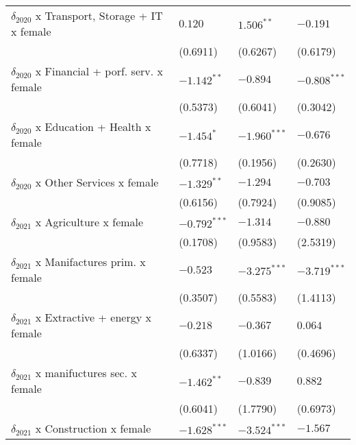 \begin{tabular}{llll}
$\delta_{2020}$ x Transport, Storage + IT x female &            $0.120$ &       $1.506^{**}$ &           $-0.191$ \\
                                                   &           (0.6911) &           (0.6267) &           (0.6179) \\
$\delta_{2020}$ x Financial + porf. serv. x female &      $-1.142^{**}$ &           $-0.894$ &     $-0.808^{***}$ \\
                                                   &           (0.5373) &           (0.6041) &           (0.3042) \\
$\delta_{2020}$ x Education + Health x female      &         $-1.454^*$ &     $-1.960^{***}$ &           $-0.676$ \\
                                                   &           (0.7718) &           (0.1956) &           (0.2630) \\
$\delta_{2020}$ x Other Services x female          &      $-1.329^{**}$ &           $-1.294$ &           $-0.703$ \\
                                                   &           (0.6156) &           (0.7924) &           (0.9085) \\
$\delta_{2021}$ x Agriculture x female             &     $-0.792^{***}$ &           $-1.314$ &           $-0.880$ \\
                                                   &           (0.1708) &           (0.9583) &           (2.5319) \\
$\delta_{2021}$ x Manifactures prim. x female      &           $-0.523$ &     $-3.275^{***}$ &     $-3.719^{***}$ \\
                                                   &           (0.3507) &           (0.5583) &           (1.4113) \\
$\delta_{2021}$ x Extractive + energy x female     &           $-0.218$ &           $-0.367$ &            $0.064$ \\
                                                   &           (0.6337) &           (1.0166) &           (0.4696) \\
$\delta_{2021}$ x manifuctures sec. x female       &      $-1.462^{**}$ &           $-0.839$ &            $0.882$ \\
                                                   &           (0.6041) &           (1.7790) &           (0.6973) \\
$\delta_{2021}$ x Construction x female            &     $-1.628^{***}$ &     $-3.524^{***}$ &           $-1.567$ \\

\end{tabular}

